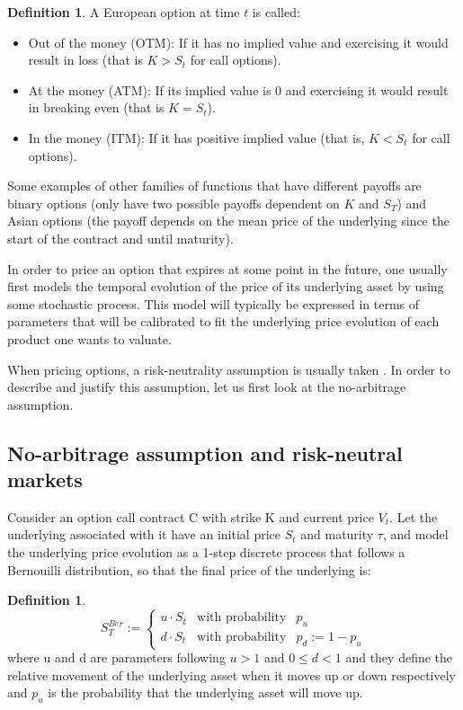 \documentclass[12,twoside]{mammeTFM}
\theoremstyle{definition}
\newtheorem{definition}[thm]{Definition}
\theoremstyle{remark}
\begin{document}
\begin{definition} A European option at time $t$ is called:
\begin{itemize}
\item {Out of the money (OTM):} If it has no implied value and exercising it would result in loss (that is $K > S_t$ for call options).
\item {At the money (ATM):} If its implied value is 0 and exercising it would result in breaking even (that is $K = S_t$).
\item {In the money (ITM):} If it has positive implied value (that is, $K < S_t$ for call options).
\end{itemize}

\end{definition}

Some examples of other families of functions that have different payoffs are binary options (only have two possible payoffs dependent on $K$ and $S_T$) and Asian options (the payoff depends on the mean price of the underlying since the start of the contract and until maturity).

In order to price an option that expires at some point in the future, one usually first models the temporal evolution of the price of its underlying asset by using some stochastic process. This model will typically be expressed in terms of parameters that will be calibrated to fit the underlying price evolution of each product one wants to valuate.

When pricing options, a risk-neutrality assumption is usually taken \cite{hul09}. In order to describe and justify this assumption, let us first look at the no-arbitrage assumption.

\subsection{No-arbitrage assumption and risk-neutral markets}\label{subsec:riks_neutral}

Consider an option call contract C with strike K and current price $V_t$. Let the underlying associated with it have an initial price $S_t$ and maturity $\tau$, and model the underlying price evolution as a 1-step discrete process that follows a Bernouilli distribution, so that the final price of the underlying is:
\begin{definition}
\begin{equation}
S_T^{Ber} := \left\{ \begin{array}{rcl} u \cdot S_t & \mbox{with probability} & p_u \\
 d \cdot S_t & \mbox{with probability} & p_d := 1 -p_u \end{array}\right.
\end{equation}
where u and d are parameters following $u > 1$ and $0 \leq d < 1$ and they define the relative movement of the underlying asset when it moves up or down respectively and $p_u$ is the probability that the underlying asset will move up.
\end{definition}
\end{document}
